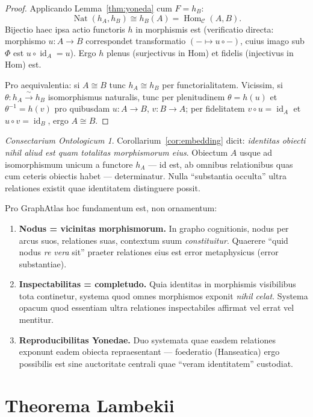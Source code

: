 \documentclass[11pt]{article}
\theoremstyle{plain}
\theoremstyle{definition}
\theoremstyle{remark}
\newtheorem*{consectarium}{Consectarium Ontologicum}
\newcommand{\C}{\mathcal{C}}
\newcommand{\Hom}{\operatorname{Hom}}
\newcommand{\Nat}{\operatorname{Nat}}
\newcommand{\id}{\operatorname{id}}
\newcommand{\yon}{\text{\usefont{U}{min}{m}{n}\symbol{'110}}} %
\renewcommand{\yon}{h}
\begin{document}
\begin{proof}
Applicando Lemma~\ref{thm:yoneda} cum $F = h_B$:
\[
\Nat(h_A, h_B) \cong h_B(A) = \Hom_\C(A, B).
\]
Bijectio haec ipsa actio functoris $\yon$ in morphismis est (verificatio directa: morphismo $u\colon A \to B$ correspondet transformatio $(- \mapsto u \circ -)$, cuius imago sub $\Phi$ est $u \circ \id_A = u$). Ergo $\yon$ plenus (surjectivus in Hom) et fidelis (injectivus in Hom) est.

Pro aequivalentia: si $A \cong B$ tunc $h_A \cong h_B$ per functorialitatem. Vicissim, si $\theta\colon h_A \xrightarrow{\;\sim\;} h_B$ isomorphismus naturalis, tunc per plenitudinem $\theta = \yon(u)$ et $\theta^{-1} = \yon(v)$ pro quibusdam $u\colon A \to B$, $v\colon B \to A$; per fidelitatem $v \circ u = \id_A$ et $u \circ v = \id_B$, ergo $A \cong B$.
\end{proof}

\begin{consectarium}
Corollarium~\ref{cor:embedding} dicit: \emph{identitas obiecti nihil aliud est quam totalitas morphismorum eius}. Obiectum $A$ usque ad isomorphismum unicum a functore $h_A$ --- id est, ab omnibus relationibus quas cum ceteris obiectis habet --- determinatur. Nulla ``substantia occulta'' ultra relationes existit quae identitatem distinguere possit.

Pro GraphAtlas hoc fundamentum est, non ornamentum:
\begin{enumerate}[label=(\alph*)]
\item \textbf{Nodus = vicinitas morphismorum.} In grapho cognitionis, nodus per arcus suos, relationes suas, contextum suum \emph{constituitur}. Quaerere ``quid nodus \emph{re vera} sit'' praeter relationes eius est error metaphysicus (error substantiae).
\item \textbf{Inspectabilitas = completudo.} Quia identitas in morphismis visibilibus tota continetur, systema quod omnes morphismos exponit \emph{nihil celat}. Systema opacum quod essentiam ultra relationes inspectabiles affirmat vel errat vel mentitur.
\item \textbf{Reproducibilitas Yonedae.} Duo systemata quae easdem relationes exponunt eadem obiecta repraesentant --- foederatio (Hanseatica) ergo possibilis est sine auctoritate centrali quae ``veram identitatem'' custodiat.
\end{enumerate}
\end{consectarium}

\section{Theorema Lambekii}
\end{document}
